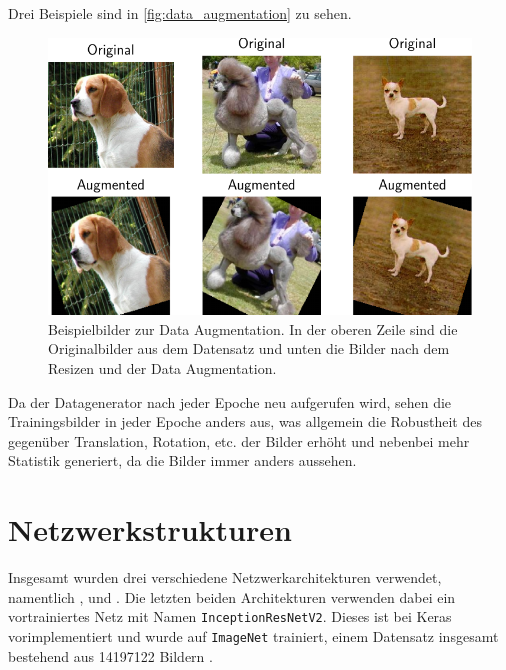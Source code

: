 Drei Beispiele sind in \autoref{fig:data_augmentation} zu sehen.

\begin{figure}
  \centering
  \includegraphics[width=\the\textwidth]{pics/subplot.pdf}
  \caption{Beispielbilder zur Data Augmentation. In der oberen Zeile sind die
  Originalbilder aus dem Datensatz und unten die Bilder nach dem Resizen und der Data Augmentation.}
  \label{fig:data_augmentation}
\end{figure}

Da der Datagenerator nach jeder Epoche neu aufgerufen wird, sehen die
Trainingsbilder in jeder Epoche anders aus, was allgemein die Robustheit des
\CNN gegenüber Translation, Rotation, etc. der Bilder erhöht und nebenbei mehr
Statistik generiert, da die Bilder immer anders aussehen.

\section{Netzwerkstrukturen}
\label{sec:netzwerk}
Insgesamt wurden drei verschiedene Netzwerkarchitekturen verwendet, namentlich
\MiniDog, \PreDog und \PreBig. Die letzten beiden Architekturen verwenden dabei
ein vortrainiertes Netz mit Namen \texttt{InceptionResNetV2}. Dieses ist bei
Keras vorimplementiert \cite{inception} und wurde auf \texttt{ImageNet}
trainiert, einem Datensatz insgesamt bestehend aus 14197122 Bildern
\cite{imagenet}.

